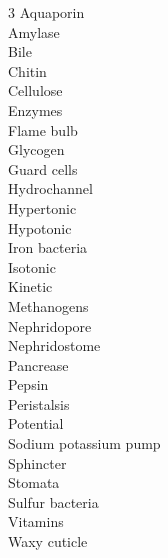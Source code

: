 
\begin{multicols}{3}
Aquaporin \\
Amylase \\
Bile \\
Chitin \\
Cellulose \\
Enzymes \\
Flame bulb \\
Glycogen \\
Guard cells \\
Hydrochannel \\
Hypertonic \\
Hypotonic \\
Iron bacteria \\
Isotonic \\
Kinetic \\
Methanogens \\
Nephridopore \\
Nephridostome \\
Pancrease \\
Pepsin \\
Peristalsis \\
Potential \\
Sodium potassium pump \\
Sphincter \\
Stomata \\
Sulfur bacteria \\
Vitamins \\
Waxy cuticle
\end{multicols}
